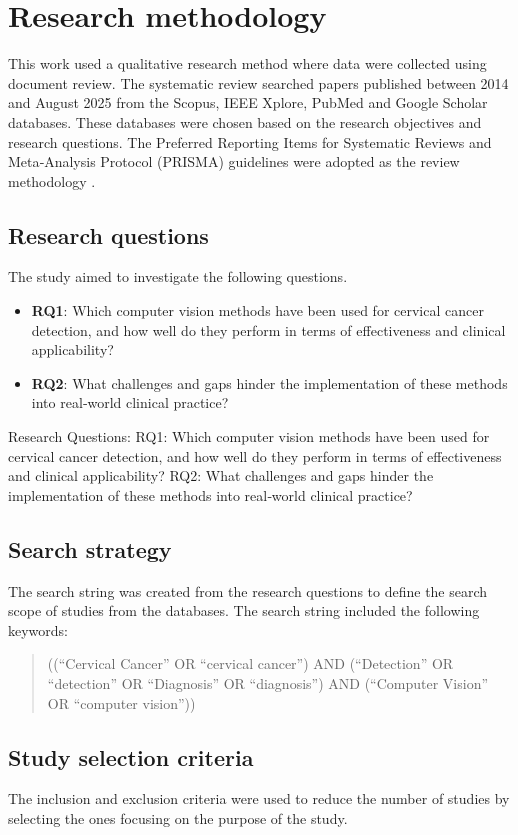\documentclass[final,5p,times,twocolumn,authoryear]{elsarticle}
\begin{document}
\section{Research methodology}
This work used a qualitative research method where data were collected using document review. The systematic review searched papers published between 2014 and August 2025 from the Scopus, IEEE Xplore, PubMed and Google Scholar databases. These databases were chosen based on the research objectives and research questions. The Preferred Reporting Items for Systematic Reviews and Meta‑Analysis Protocol (PRISMA) guidelines were adopted as the review methodology \cite{ref16}.
\subsection{Research questions}
The study aimed to investigate the following questions.
\begin{itemize}
\item \textbf{RQ1}: Which computer vision methods have been used for cervical cancer detection, and how well do they perform in terms of effectiveness and clinical applicability?
\item \textbf{RQ2}: What challenges and gaps hinder the implementation of these methods into real‑world clinical practice?
\end{itemize}

Research Questions: RQ1: Which computer vision methods have been used for cervical cancer detection, and how well do they perform in terms of effectiveness and clinical applicability? RQ2: What challenges and gaps hinder the implementation of these methods into real‑world clinical practice?
\subsection{Search strategy}
The search string was created from the research questions to define the search scope of studies from the databases. The search string included the following keywords:
\begin{quote}
((“Cervical Cancer” OR “cervical cancer”) AND (“Detection” OR “detection” OR “Diagnosis” OR “diagnosis”) AND (“Computer Vision” OR “computer vision”))
\end{quote}
\subsection{Study selection criteria}
The inclusion and exclusion criteria were used to reduce the number of studies by selecting the ones focusing on the purpose of the study.
\end{document}
